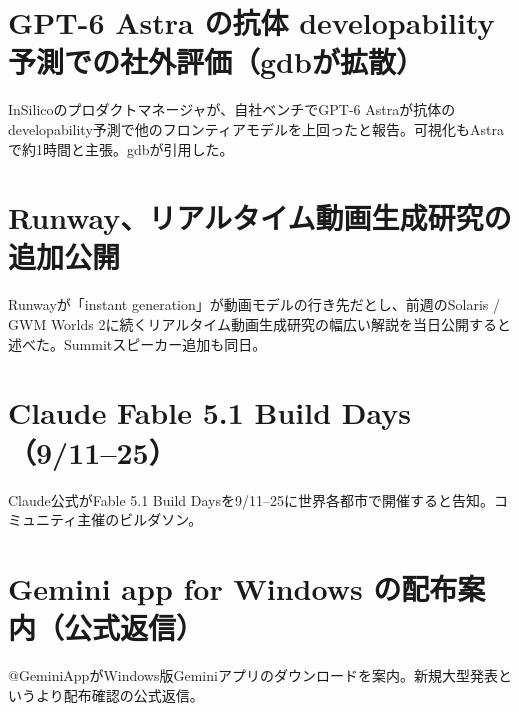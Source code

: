 \section{GPT-6 Astra の抗体 developability 予測での社外評価（gdbが拡散）}
InSilicoのプロダクトマネージャが、自社ベンチでGPT-6 Astraが抗体のdevelopability予測で他のフロンティアモデルを上回ったと報告。可視化もAstraで約1時間と主張。gdbが引用した。

\section{Runway、リアルタイム動画生成研究の追加公開}
Runwayが「instant generation」が動画モデルの行き先だとし、前週のSolaris / GWM Worlds 2に続くリアルタイム動画生成研究の幅広い解説を当日公開すると述べた。Summitスピーカー追加も同日。

\section{Claude Fable 5.1 Build Days（9/11--25）}
Claude公式がFable 5.1 Build Daysを9/11--25に世界各都市で開催すると告知。コミュニティ主催のビルダソン。

\section{Gemini app for Windows の配布案内（公式返信）}
@GeminiAppがWindows版Geminiアプリのダウンロードを案内。新規大型発表というより配布確認の公式返信。


